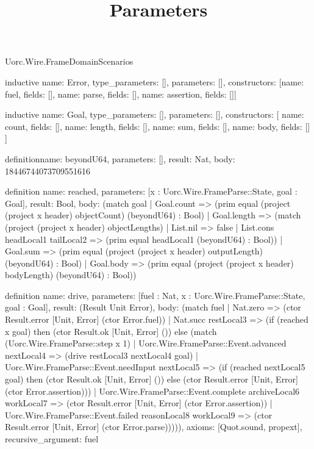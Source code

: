 \begin{lexlean}{Uorc.Wire.FrameDomainScenarios}
\title{Parameters}
\begin{semanticmodule}
inductive{
  name: Error,
  type_parameters: [],
  parameters: [],
  constructors: [{name: fuel, fields: []}, {name: parse, fields: []}, {name: assertion, fields: []}]
}

inductive{
  name: Goal,
  type_parameters: [],
  parameters: [],
  constructors: [
    {name: count, fields: []},
    {name: length, fields: []},
    {name: sum, fields: []},
    {name: body, fields: []}
  ]
}

definition{name: beyondU64, parameters: [], result: Nat, body: 18446744073709551616}

definition{
  name: reached,
  parameters: [x : Uorc.Wire.FrameParse::State, goal : Goal],
  result: Bool,
  body: (match goal
    | Goal.count => (prim equal (project (project x header) objectCount) (beyondU64) : Bool)
    | Goal.length => (match (project (project x header) objectLengths)
      | List.nil => false
      | List.cons headLocal1 tailLocal2 => (prim equal headLocal1 (beyondU64) : Bool))
    | Goal.sum => (prim equal (project (project x header) outputLength) (beyondU64) : Bool)
    | Goal.body => (prim equal (project (project x header) bodyLength) (beyondU64) : Bool))
}

definition{
  name: drive,
  parameters: [fuel : Nat, x : Uorc.Wire.FrameParse::State, goal : Goal],
  result: (Result Unit Error),
  body: (match fuel
    | Nat.zero => (ctor Result.error [Unit, Error] (ctor Error.fuel))
    | Nat.succ restLocal3 => (if (reached x goal) then (ctor Result.ok [Unit, Error] ()) else (match (Uorc.Wire.FrameParse::step x 1)
      | Uorc.Wire.FrameParse::Event.advanced nextLocal4 => (drive restLocal3 nextLocal4 goal)
      | Uorc.Wire.FrameParse::Event.needInput nextLocal5 => (if (reached nextLocal5 goal) then (ctor Result.ok [Unit, Error] ()) else (ctor Result.error [Unit, Error] (ctor Error.assertion)))
      | Uorc.Wire.FrameParse::Event.complete archiveLocal6 workLocal7 => (ctor Result.error [Unit, Error] (ctor Error.assertion))
      | Uorc.Wire.FrameParse::Event.failed reasonLocal8 workLocal9 => (ctor Result.error [Unit, Error] (ctor Error.parse))))),
  axioms: [Quot.sound, propext],
  recursive_argument: fuel
}


\end{semanticmodule}
\end{lexlean}
